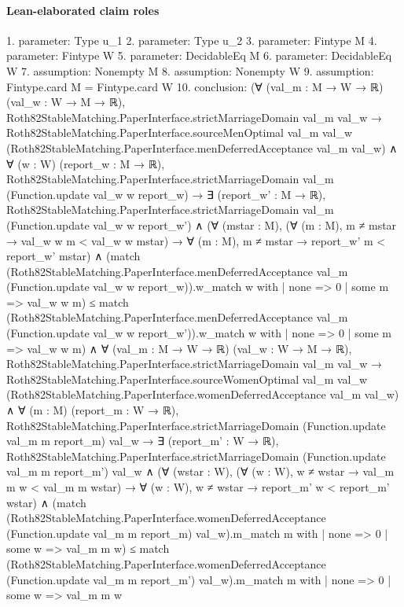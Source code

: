\documentclass[10pt]{article}
\begin{document}
\paragraph{Lean-elaborated claim roles}\begin{ReviewVerbatim}
1. parameter: Type u_1
2. parameter: Type u_2
3. parameter: Fintype M
4. parameter: Fintype W
5. parameter: DecidableEq M
6. parameter: DecidableEq W
7. assumption: Nonempty M
8. assumption: Nonempty W
9. assumption: Fintype.card M = Fintype.card W
10. conclusion: (∀ (val_m : M → W → ℝ) (val_w : W → M → ℝ),
    Roth82StableMatching.PaperInterface.strictMarriageDomain val_m val_w →
      Roth82StableMatching.PaperInterface.sourceMenOptimal val_m val_w
          (Roth82StableMatching.PaperInterface.menDeferredAcceptance val_m val_w) ∧
        ∀ (w : W) (report_w : M → ℝ),
          Roth82StableMatching.PaperInterface.strictMarriageDomain val_m (Function.update val_w w report_w) →
            ∃ (report_w' : M → ℝ),
              Roth82StableMatching.PaperInterface.strictMarriageDomain val_m (Function.update val_w w report_w') ∧
                (∀ (mstar : M),
                    (∀ (m : M), m ≠ mstar → val_w w m < val_w w mstar) →
                      ∀ (m : M), m ≠ mstar → report_w' m < report_w' mstar) ∧
                  (match
                      (Roth82StableMatching.PaperInterface.menDeferredAcceptance val_m
                            (Function.update val_w w report_w)).w_match
                        w with
                    | none => 0
                    | some m => val_w w m) ≤
                    match
                      (Roth82StableMatching.PaperInterface.menDeferredAcceptance val_m
                            (Function.update val_w w report_w')).w_match
                        w with
                    | none => 0
                    | some m => val_w w m) ∧
  ∀ (val_m : M → W → ℝ) (val_w : W → M → ℝ),
    Roth82StableMatching.PaperInterface.strictMarriageDomain val_m val_w →
      Roth82StableMatching.PaperInterface.sourceWomenOptimal val_m val_w
          (Roth82StableMatching.PaperInterface.womenDeferredAcceptance val_m val_w) ∧
        ∀ (m : M) (report_m : W → ℝ),
          Roth82StableMatching.PaperInterface.strictMarriageDomain (Function.update val_m m report_m) val_w →
            ∃ (report_m' : W → ℝ),
              Roth82StableMatching.PaperInterface.strictMarriageDomain (Function.update val_m m report_m') val_w ∧
                (∀ (wstar : W),
                    (∀ (w : W), w ≠ wstar → val_m m w < val_m m wstar) →
                      ∀ (w : W), w ≠ wstar → report_m' w < report_m' wstar) ∧
                  (match
                      (Roth82StableMatching.PaperInterface.womenDeferredAcceptance (Function.update val_m m report_m)
                            val_w).m_match
                        m with
                    | none => 0
                    | some w => val_m m w) ≤
                    match
                      (Roth82StableMatching.PaperInterface.womenDeferredAcceptance (Function.update val_m m report_m')
                            val_w).m_match
                        m with
                    | none => 0
                    | some w => val_m m w
\end{ReviewVerbatim}
\end{document}
